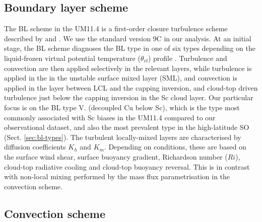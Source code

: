 \subsection{Boundary layer scheme}
\label{sec:bl-scheme}

The BL scheme in the UM11.4 is a first-order closure turbulence
scheme described by \cite{lock2000} and \cite{martin2000}. We use the standard
version 9C in our analysis.
At an initial stage, the BL scheme diagnoses the BL type
in one of six types depending on the liquid-frozen virtual potential
temperature ($\theta_{vl}$) profile \cite[Fig. 1]{lock2000}. Turbulence and convection
are then applied selectively in the relevant layers, while turbulence is applied in
the in the unstable surface mixed layer (SML), and convection is applied in the layer between
LCL and the capping inversion, and cloud-top driven turbulence just below
the capping inversion in the Sc cloud layer. Our particular focus is on
the BL type V. (decoupled Cu below Sc), which is the type most commonly
associated with Sc biases in the UM11.4 compared to our observational dataset,
and also the most prevalent type in the high-latitude SO (Sect. \ref{sec:bl-types}).
The turbulent locally-mixed layers are characterised by diffusion coefficients
$K_h$ and $K_m$. Depending on conditions, these are based on the surface wind
shear, surface buoyancy gradient, Richardson number ($Ri$),
cloud-top radiative cooling and cloud-top buoyancy reversal. This is in contrast
with non-local mixing performed by the mass flux parametrisation in the
convection scheme.

\subsection{Convection scheme}
\label{sec:convection-scheme}

